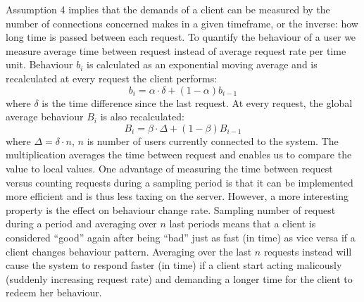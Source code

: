 Assumption 4 implies that the demands of a client can be measured by the number of connections concerned makes in a given timeframe, or the inverse: how long time is passed between each request. 
To quantify the behaviour of a user we measure average time between request instead of average request rate per time unit. Behaviour $b_i$ is calculated as an exponential moving average and is recalculated at every request the client performs:
 $$ b_{i} = \alpha\cdot\delta + (1-\alpha)b_{i-1} $$
where $\delta$ is the time difference since the last request. At every request, the global average behaviour $B_i$ is also recalculated:
$$ B_{i} = \beta\cdot\Delta + (1-\beta)B_{i-1} $$
where $\Delta = \delta \cdot n$, $n$ is number of users currently connected to the system. The multiplication averages the time between request and enables us to compare the value to local values. 
One advantage of measuring the time between request versus counting requests during a sampling period is that it can be implemented more efficient and is thus less taxing on the server. However, a more interesting property is the effect on behaviour change rate. Sampling number of request during a period and averaging over $n$ last periods means that a client is considered ``good'' again after being ``bad'' just as fast (in time) as vice versa if a client changes behaviour pattern.
Averaging over the last $n$ requests instead will cause the system to respond faster (in time) if a client start acting malicously (suddenly increasing request rate) and demanding a longer time for the client to redeem her behaviour.




